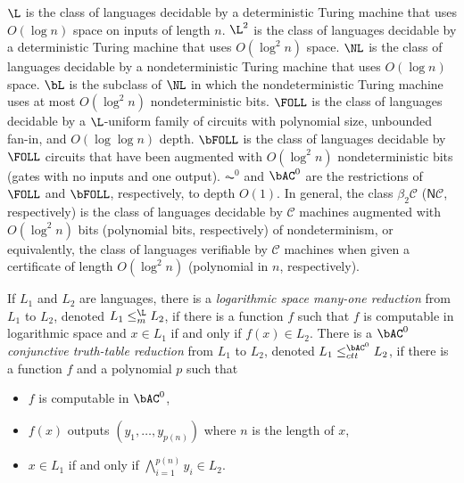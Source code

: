 \documentclass{article}
\begin{document}
$\L$ is the class of languages decidable by a deterministic Turing machine that uses $O(\log n)$ space on inputs of length $n$.
$\L^2$ is the class of languages decidable by a deterministic Turing machine that uses $O(\log^2 n)$ space.
$\NL$ is the class of languages decidable by a nondeterministic Turing machine that uses $O(\log n)$ space.
$\bL$ is the subclass of $\NL$ in which the nondeterministic Turing machine uses at most $O(\log^2 n)$ nondeterministic bits.
$\FOLL$ is the class of languages decidable by a $\L$-uniform family of circuits with polynomial size, unbounded fan-in, and $O(\log \log n)$ depth.
$\bFOLL$ is the class of languages decidable by $\FOLL$ circuits that have been augmented with $O(\log^2 n)$ nondeterministic bits (gates with no inputs and one output).
$\AC^0$ and $\bAC^0$ are the restrictions of $\FOLL$ and $\bFOLL$, respectively, to depth $O(1)$.
In general, the class $\beta_2 \mathcal{C}$ ($\mathsf{N} \mathcal{C}$, respectively) is the class of languages decidable by $\mathcal{C}$ machines augmented with $O(\log^2 n)$ bits (polynomial bits, respectively) of nondeterminism, or equivalently, the class of languages verifiable by $\mathcal{C}$ machines when given a certificate of length $O(\log^2 n)$ (polynomial in $n$, respectively).

If $L_1$ and $L_2$ are languages, there is a \emph{logarithmic space many-one reduction} from $L_1$ to $L_2$, denoted $L_1 \leq_m^{\L} L_2$, if there is a function $f$ such that $f$ is computable in logarithmic space and $x \in L_1$ if and only if $f(x) \in L_2$.
There is a \emph{$\bAC^0$ conjunctive truth-table reduction} from $L_1$ to $L_2$, denoted $L_1 \leq^{\bAC^0}_{ctt} L_2$, if there is a function $f$ and a polynomial $p$ such that
\begin{itemize}
\item $f$ is computable in $\bAC^0$,
\item $f(x)$ outputs $(y_1, \dotsc, y_{p(n)})$ where $n$ is the length of $x$,
\item $x \in L_1$ if and only if $\bigwedge_{i = 1}^{p(n)} y_i \in L_2$.
\end{itemize}
\end{document}

